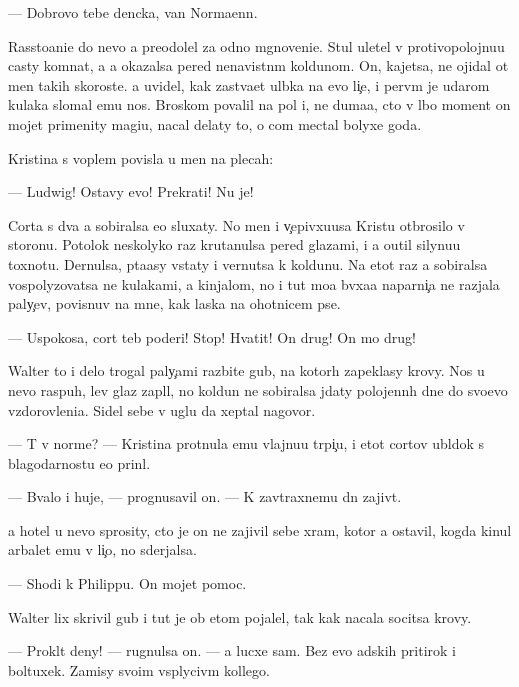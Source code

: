 \documentclass[10pt]{book}
\begin{document}
— Dobrovo tebe den{\e}cka, van Normaenn.

Rassto{\y}ani{\y}e do nevo {\y}a preodolel za odno mgnoveni{\y}e. Stul uletel v protivopolojnu{\y}u casty komnat{\yi}, a {\y}a okazalsa pered nenavistn{\yi}m koldunom. On, kajetsa, ne ojidal ot men{\ia} takih skoroste{\y}. {\Y}a uvidel, kak zast{\yi}va{\y}et ul{\yi}bka na {\y}evo li{\c}e, i perv{\yi}m je udarom kulaka slomal {\y}emu nos. Broskom povalil na pol i, ne duma{\y}a, cto v l{\iu}bo{\y} moment on mojet primenity magi{\y}u, nacal delaty to, o com mectal bolyxe goda.

Kristina s voplem povisla u men{\ia} na plecah:

— Ludwig! Ostavy {\y}evo! Prekrati! Nu je!

Corta s dva {\y}a sobiralsa {\y}e{\y}o sluxaty. No men{\ia} i v{\c}epivxu{\y}usa Kristu otbrosilo v storonu. Potolok neskolyko raz krutanulsa pered glazami, i {\y}a o{\x}util silynu{\y}u toxnotu. Dernulsa, p{\yi}ta{\y}asy vstaty i vernutsa k koldunu. Na etot raz {\y}a sobiralsa vospolyzovatsa ne kulakami, a kinjalom, no i tut mo{\y}a b{\yi}vxa{\y}a naparni{\c}a ne razjala paly{\c}ev, povisnuv na mne, kak laska na ohotnic{\y}em pse.

— Uspoko{\y}sa, cort teb{\ia} poderi! Stop! Hvatit! On drug! On mo{\y} drug!



Walter to i delo trogal paly{\c}ami razbit{\yi}{\y}e gub{\yi}, na kotor{\yi}h zapeklasy krovy. Nos u nevo raspuh, lev{\yi}{\y} glaz zapl{\yi}l, no koldun ne sobiralsa jdaty polojenn{\yi}h dne{\y} do svo{\y}evo v{\yi}zdorovleni{\y}a. Sidel sebe v uglu da xeptal nagovor{\yi}.

— T{\yi} v norme? — Kristina prot{\ia}nula {\y}emu vlajnu{\y}u tr{\ia}pi{\c}u, i etot cortov ubl{\iu}dok s blagodarnost{\y}u {\y}e{\y}o prin{\ia}l.

— B{\yi}valo i huje, — prognusavil on. — K zavtraxnemu dn{\iu} zajiv{\e}t.

{\Y}a hotel u nevo sprosity, cto je on ne zajivil sebe xram, kotor{\yi}{\y} {\y}a ostavil, kogda kinul arbalet {\y}emu v li{\c}o, no sderjalsa.

— Shodi k Philippu. On mojet pomoc.

Walter lix skrivil gub{\yi} i tut je ob etom pojalel, tak kak nacala socitsa krovy.

— Prokl{\ia}t{\yi}{\y} deny! — rugnulsa on. — {\Y}a lucxe sam. Bez {\y}evo adskih pritirok i boltuxek. Za{\y}misy svo{\y}im vsp{\yi}lyciv{\yi}m kollego{\y}.
\end{document}
